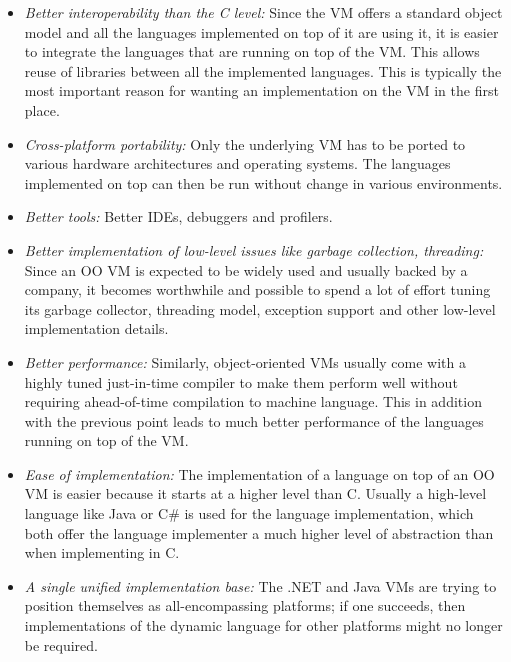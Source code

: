 \documentclass{llncs}
\begin{document}
\begin{itemize}
\item
\emph{Better interoperability than the C level:} Since the VM offers a standard
object model and all the languages implemented on top of it are using it, it is
easier to integrate the languages that are running on top of the VM. This
allows reuse of libraries between all the implemented languages. This is
typically the most important reason for wanting an implementation on the VM in
the first place.

\item
\emph{Cross-platform portability:} Only the underlying VM has to be ported to
various hardware architectures and operating systems. The languages implemented
on top can then be run without change in various environments.

\item
\emph{Better tools:} Better IDEs, debuggers and profilers.

\item
\emph{Better implementation of low-level issues like garbage collection,
threading:} Since an OO VM is expected to be widely used and usually backed by
a company, it becomes worthwhile and possible to spend a lot of effort tuning
its garbage collector, threading model, exception support and other low-level
implementation details.

\item
\emph{Better performance:} Similarly, object-oriented VMs usually come with a
highly tuned just-in-time compiler to make them perform well without requiring
ahead-of-time compilation to machine language. This in addition with the
previous point leads to much better performance of the languages running on top
of the VM.

\item
\emph{Ease of implementation:} The implementation of a language on top of an OO
VM is easier because it starts at a higher level than C. Usually a
high-level language like Java or C\# is used for the language implementation,
which both offer the language implementer a much higher level of abstraction
than when implementing in C. 

\item
\emph{A single unified implementation base:} The .NET and Java VMs are trying
to position themselves as all-encompassing platforms; if one succeeds, then
implementations of the dynamic language for other platforms might no longer
be required.
\end{itemize}
\end{document}
